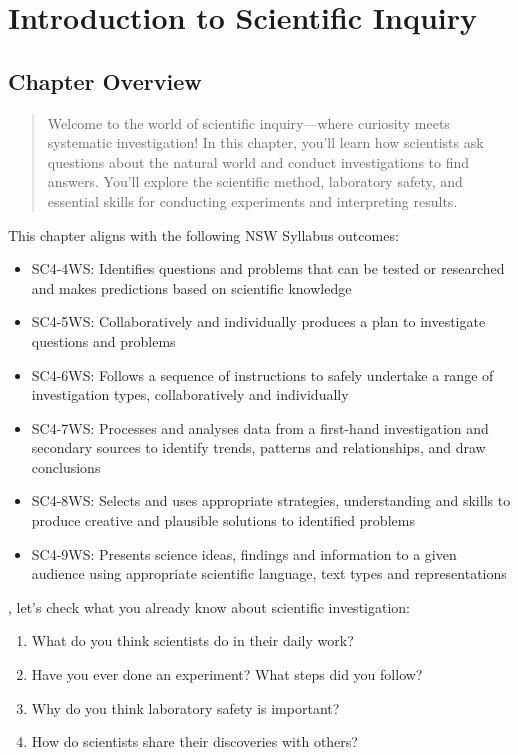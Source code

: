 \chapter{Introduction to Scientific Inquiry}

\section*{Chapter Overview}

\begin{quote}
    Welcome to the world of scientific inquiry—where curiosity meets systematic investigation! In this chapter, you'll learn how scientists ask questions about the natural world and conduct investigations to find answers. You'll explore the scientific method, laboratory safety, and essential skills for conducting experiments and interpreting results.
\end{quote}

\noindent This chapter aligns with the following NSW Syllabus outcomes:
\begin{itemize}
    \item SC4-4WS: Identifies questions and problems that can be tested or researched and makes predictions based on scientific knowledge
    \item SC4-5WS: Collaboratively and individually produces a plan to investigate questions and problems
    \item SC4-6WS: Follows a sequence of instructions to safely undertake a range of investigation types, collaboratively and individually
    \item SC4-7WS: Processes and analyses data from a first-hand investigation and secondary sources to identify trends, patterns and relationships, and draw conclusions
    \item SC4-8WS: Selects and uses appropriate strategies, understanding and skills to produce creative and plausible solutions to identified problems
    \item SC4-9WS: Presents science ideas, findings and information to a given audience using appropriate scientific language, text types and representations
\end{itemize}

, let's check what you already know about scientific investigation:

\begin{stopandthink}
\begin{enumerate}
    \item What do you think scientists do in their daily work?
    \item Have you ever done an experiment? What steps did you follow?
    \item Why do you think laboratory safety is important?
    \item How do scientists share their discoveries with others?
\end{enumerate}
\end{stopandthink}

